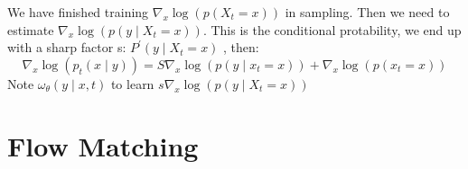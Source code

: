 \documentclass{article}
\begin{document}
    
We have finished training  $\nabla_{x} \log \left(p\left(X_{t}=x\right)\right)$  in sampling. Then we need to estimate  $\nabla_{x} \log \left(p\left(y \mid X_{t}=x\right)\right)$. This is the conditional protability, we end up with a sharp factor s: $P^{\prime}\left(y \mid X_{t}=x\right)$ , then:
\begin{equation}
    \nabla_{x} \log \left(p_{t}(x \mid y)\right)=S \nabla_{x} \log \left(p\left(y \mid x_{t}=x\right)\right)+\nabla_{x} \log \left(p\left(x_{t}=x\right)\right)
\end{equation}
Note  $\omega_{\theta}(y \mid x, t)$  to learn  $s \nabla_{x} \log \left(p\left(y \mid X_{t}=x\right)\right)$ 

\section{Flow Matching}
\end{document}
